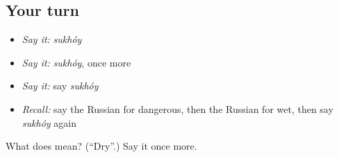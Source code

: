\subsection*{Your turn}
\begin{itemize}
\raggedright
  \item \emph{Say it:} \emph{sukhóy}
  \item \emph{Say it:} \emph{sukhóy}, once more
  \item \emph{Say it:} say \emph{sukhóy}
  \item \emph{Recall:} say the Russian for dangerous, then the Russian for wet, then say \emph{sukhóy} again
\end{itemize}

\begin{tcolorbox}[breakable,colback=teal!4,colframe=teal!35!black,title={Before you move on}]
What does  mean? (\textquotedblleft{}Dry\textquotedblright{}.) Say it once more.
\end{tcolorbox}
